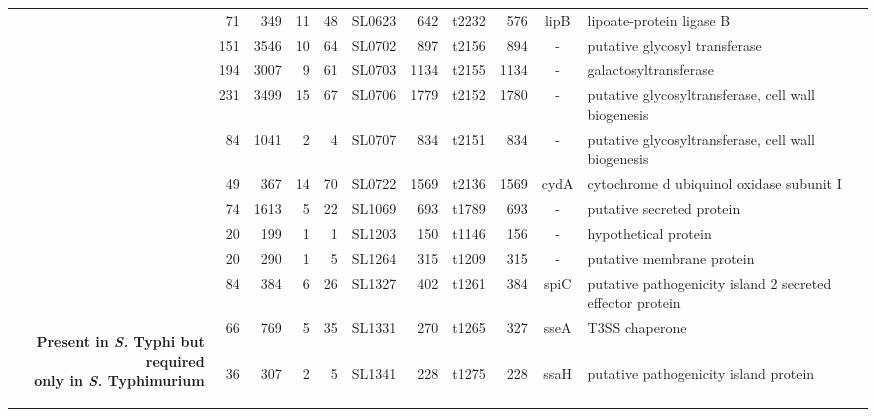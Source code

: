 \begin{landscape}
\begin{longtable}{ r
    				r
				r
				r
				r
				l
				r
				r
				r
				c
				p{1.8in}}
   & 71    & 349   & 11    & 48    & SL0623 & 642   & t2232 & 576   & lipB  & lipoate-protein ligase B \\
   & 151   & 3546  & 10    & 64    & SL0702 & 897   & t2156 & 894   & -     & putative glycosyl transferase \\
   & 194   & 3007  & 9     & 61    & SL0703 & 1134  & t2155 & 1134  & -     & galactosyltransferase \\
   & 231   & 3499  & 15    & 67    & SL0706 & 1779  & t2152 & 1780  & -     & putative glycosyltransferase, cell wall biogenesis \\
   & 84    & 1041  & 2     & 4     & SL0707 & 834   & t2151 & 834   & -     & putative glycosyltransferase, cell wall biogenesis \\
   & 49    & 367   & 14    & 70    & SL0722 & 1569  & t2136 & 1569  & cydA  & cytochrome d ubiquinol oxidase subunit I \\
   &\cellcolor{Gray}74    &\cellcolor{Gray}1613  &\cellcolor{Gray}5     &\cellcolor{Gray}22    &\cellcolor{Gray}SL1069 &\cellcolor{Gray}693   &\cellcolor{Gray}t1789 &\cellcolor{Gray}693   &\cellcolor{Gray}-     &\cellcolor{Gray}putative secreted protein \\
   & 20    & 199   & 1     & 1     & SL1203 & 150   & t1146 & 156   & -     & hypothetical protein \\
   & 20    & 290   & 1     & 5     & SL1264 & 315   & t1209 & 315   & -     & putative membrane protein \\
   &\cellcolor{Gray}84    &\cellcolor{Gray}384   &\cellcolor{Gray}6     &\cellcolor{Gray}26    &\cellcolor{Gray}SL1327 &\cellcolor{Gray}402   &\cellcolor{Gray}t1261 &\cellcolor{Gray}384   &\cellcolor{Gray}spiC  &\cellcolor{Gray}putative pathogenicity island 2 secreted effector protein \\
    \multirow{25}{*}{\begin{sideways}\parbox{3in}{\centering\textbf{Present in {\it S.} Typhi but required \\only in {\it S.} Typhimurium}}\end{sideways}}&\cellcolor{Gray}66    &\cellcolor{Gray}769   &\cellcolor{Gray}5     &\cellcolor{Gray}35    &\cellcolor{Gray}SL1331 &\cellcolor{Gray}270   &\cellcolor{Gray}t1265 &\cellcolor{Gray}327   &\cellcolor{Gray}sseA  & \cellcolor{Gray}T3SS chaperone \\
   &\cellcolor{Gray}36    &\cellcolor{Gray}307   &\cellcolor{Gray}2     &\cellcolor{Gray}5     &\cellcolor{Gray}SL1341 &\cellcolor{Gray}228   & \cellcolor{Gray}t1275 &\cellcolor{Gray}228   &\cellcolor{Gray}ssaH  &\cellcolor{Gray}putative pathogenicity island protein \\

\end{longtable}
\end{landscape}
